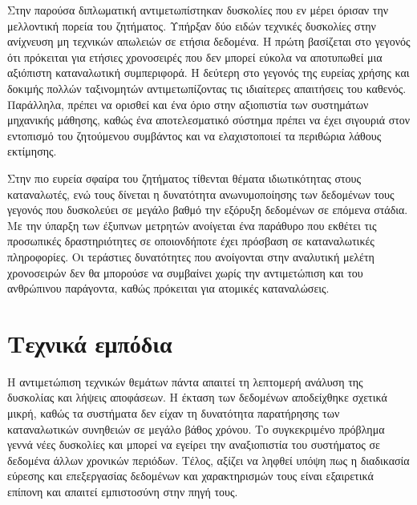 Στην παρούσα διπλωματική αντιμετωπίστηκαν δυσκολίες που εν μέρει όρισαν την μελλοντική πορεία του ζητήματος. Υπήρξαν δύο ειδών τεχνικές δυσκολίες στην ανίχνευση μη τεχνικών απωλειών σε ετήσια δεδομένα. Η πρώτη βασίζεται στο γεγονός ότι πρόκειται για ετήσιες χρονοσειρές που δεν μπορεί εύκολα να αποτυπωθεί μια αξιόπιστη καταναλωτική συμπεριφορά. Η δεύτερη στο γεγονός της ευρείας χρήσης και δοκιμής πολλών ταξινομητών αντιμετωπίζοντας τις ιδιαίτερες απαιτήσεις του καθενός. Παράλληλα, πρέπει να ορισθεί και ένα όριο στην αξιοπιστία των συστημάτων μηχανικής μάθησης, καθώς ένα αποτελεσματικό σύστημα πρέπει να έχει σιγουριά στον εντοπισμό του ζητούμενου συμβάντος και να ελαχιστοποιεί τα περιθώρια λάθους εκτίμησης.\par
Στην πιο ευρεία σφαίρα του ζητήματος τίθενται θέματα ιδιωτικότητας στους καταναλωτές, ενώ τους δίνεται η δυνατότητα ανωνυμοποίησης των δεδομένων τους \cite{anonymization} γεγονός που δυσκολεύει σε μεγάλο βαθμό την εξόρυξη δεδομένων σε επόμενα στάδια. Με την ύπαρξη των έξυπνων μετρητών ανοίγεται ένα παράθυρο που εκθέτει τις προσωπικές δραστηριότητες σε οποιονδήποτε έχει πρόσβαση σε καταναλωτικές πληροφορίες. Οι τεράστιες δυνατότητες που ανοίγονται στην αναλυτική μελέτη χρονοσειρών δεν θα μπορούσε να συμβαίνει χωρίς την αντιμετώπιση και του ανθρώπινου παράγοντα, καθώς πρόκειται για ατομικές καταναλώσεις.
\section{Τεχνικά εμπόδια}
Η αντιμετώπιση τεχνικών θεμάτων πάντα απαιτεί τη λεπτομερή ανάλυση της δυσκολίας και λήψεις αποφάσεων. Η έκταση των δεδομένων αποδείχθηκε σχετικά μικρή, καθώς τα συστήματα δεν είχαν τη δυνατότητα παρατήρησης των καταναλωτικών συνηθειών σε μεγάλο βάθος χρόνου. Το συγκεκριμένο πρόβλημα γεννά νέες δυσκολίες και μπορεί να εγείρει την αναξιοπιστία του συστήματος σε δεδομένα άλλων χρονικών περιόδων. Τέλος, αξίζει να ληφθεί υπόψη πως η διαδικασία εύρεσης και επεξεργασίας δεδομένων και χαρακτηρισμών τους είναι εξαιρετικά επίπονη και απαιτεί εμπιστοσύνη στην πηγή τους. 
